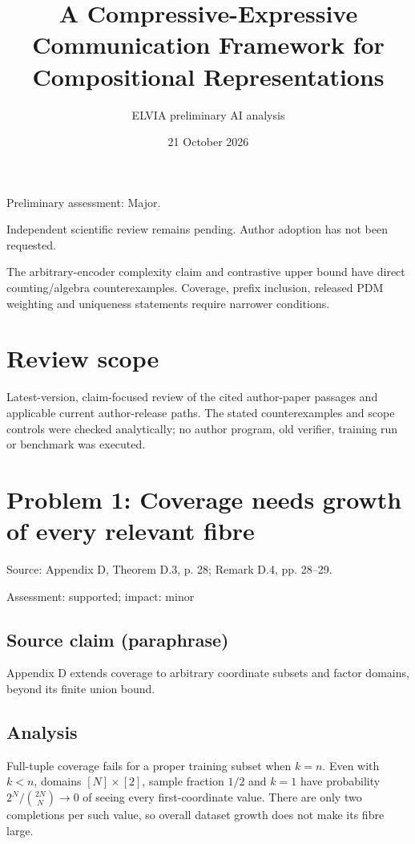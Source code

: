 \documentclass[11pt]{article}
\begin{document}
\title{A Compressive-Expressive Communication Framework for Compositional Representations}

\author{ELVIA preliminary AI analysis}\date{21 October 2026}\maketitle

Preliminary assessment: Major.\par

Independent scientific review remains pending. Author adoption has not been requested.

The arbitrary-encoder complexity claim and contrastive upper bound have direct counting/algebra counterexamples. Coverage, prefix inclusion, released PDM weighting and uniqueness statements require narrower conditions.

\section*{Review scope}

Latest-version, claim-focused review of the cited author-paper passages and applicable current author-release paths. The stated counterexamples and scope controls were checked analytically; no author program, old verifier, training run or benchmark was executed.

\section*{Problem 1: Coverage needs growth of every relevant fibre}

Source: Appendix D, Theorem D.3, p. 28; Remark D.4, pp. 28–29.

Assessment: supported; impact: minor

\subsection*{Source claim (paraphrase)}

Appendix D extends coverage to arbitrary coordinate subsets and factor domains, beyond its finite union bound.

\subsection*{Analysis}

Full-tuple coverage fails for a proper training subset when \(k=n\). Even with \(k<n\), domains \([N]\times[2]\), sample fraction \(1/2\) and \(k=1\) have probability \(2^N/\binom{2N}{N}\to0\) of seeing every first-coordinate value. There are only two completions per such value, so overall dataset growth does not make its fibre large.
\end{document}
